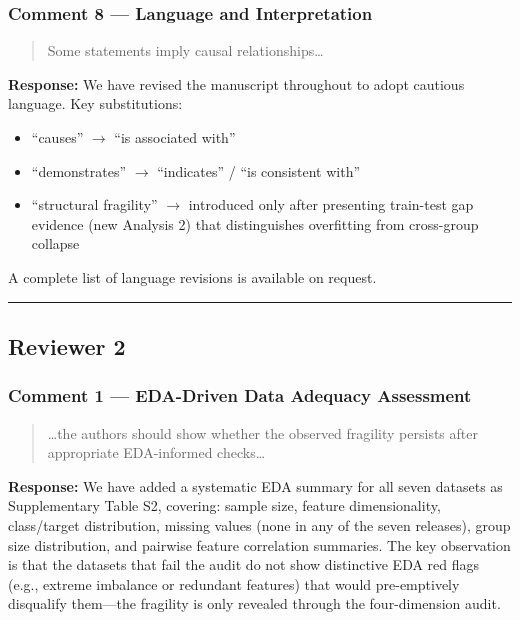 \documentclass[12pt,a4paper]{article}
\begin{document}
\subsubsection*{Comment 8 --- Language and Interpretation}

\begin{quote}
Some statements imply causal relationships\ldots
\end{quote}

\textbf{Response:} We have revised the manuscript throughout to adopt cautious language. Key substitutions:
\begin{itemize}[nosep]
\item ``causes'' $\rightarrow$ ``is associated with''
\item ``demonstrates'' $\rightarrow$ ``indicates'' / ``is consistent with''
\item ``structural fragility'' $\rightarrow$ introduced only after presenting train-test gap evidence (new Analysis 2) that distinguishes overfitting from cross-group collapse
\end{itemize}
A complete list of language revisions is available on request.

\bigskip
\hrule
\bigskip

\subsection*{Reviewer 2}

\subsubsection*{Comment 1 --- EDA-Driven Data Adequacy Assessment}

\begin{quote}
\ldots the authors should show whether the observed fragility persists after appropriate EDA-informed checks\ldots
\end{quote}

\textbf{Response:} We have added a systematic EDA summary for all seven datasets as Supplementary Table S2, covering: sample size, feature dimensionality, class/target distribution, missing values (none in any of the seven releases), group size distribution, and pairwise feature correlation summaries. The key observation is that the datasets that fail the audit do not show distinctive EDA red flags (e.g., extreme imbalance or redundant features) that would pre-emptively disqualify them---the fragility is only revealed through the four-dimension audit.
\end{document}
